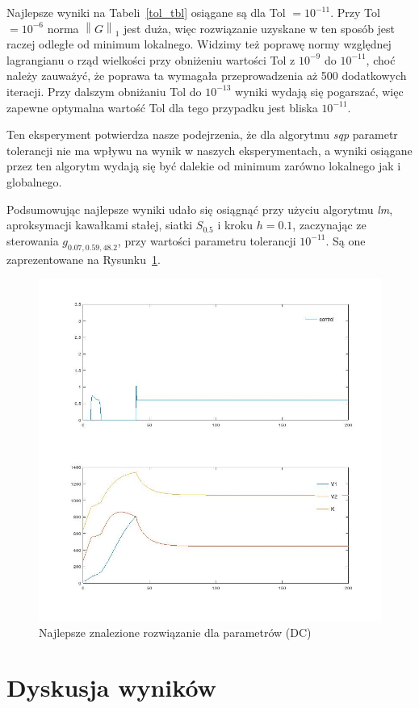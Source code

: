 \documentclass[licencjacka]{pracamgr}
\newcommand{\norm}[1]{\left\lVert#1\right\rVert}
\begin{document}
Najlepsze wyniki na Tabeli~\ref{tol_tbl} osiągane są dla Tol $= 10^{-11}$. Przy Tol $= 10^{-6}$ norma $\norm{G}_1$ jest duża, więc rozwiązanie uzyskane w ten sposób jest raczej odległe od minimum lokalnego. Widzimy też poprawę normy względnej lagrangianu o rząd wielkości przy obniżeniu wartości Tol z $10^{-9}$ do $10^{-11}$, choć należy zauważyć, że poprawa ta wymagała przeprowadzenia aż 500 dodatkowych iteracji. Przy dalszym obniżaniu Tol do $10^{-13}$ wyniki wydają się pogarszać, więc zapewne optymalna wartość Tol dla tego przypadku jest bliska $10^{-11}$.

Ten eksperyment potwierdza nasze podejrzenia, że dla algorytmu {\it sqp\/} parametr tolerancji nie ma wpływu na wynik w naszych eksperymentach, a wyniki osiągane przez ten algorytm wydają się być dalekie od minimum zarówno lokalnego jak i globalnego.

Podsumowując najlepsze wyniki udało się osiągnąć przy użyciu algorytmu {\it lm}, aproksymacji kawałkami stałej, siatki $S_{0.5}$ i kroku $h = 0.1$, zaczynając ze sterowania $g_{0.07,0.59,48.2}$, przy wartości parametru tolerancji $10^{-11}$. Są one zaprezentowane na Rysunku~\ref{plot_best_dc}.

\begin{figure}[h]
  \centering
  \includegraphics[width=.5\textwidth]{../plots/plot_best_dc}
  \caption{Najlepsze znalezione rozwiązanie dla parametrów (DC)}\label{plot_best_dc}
\end{figure}

\section{Dyskusja wyników}
\end{document}
